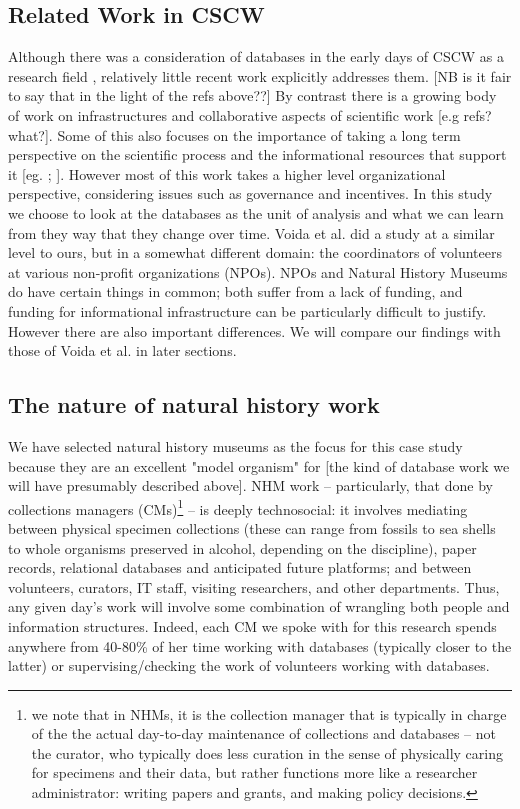 \subsection{Related Work in CSCW}
Although there was a consideration of databases in the early days of CSCW as a research field \cite{mariani1991impact}, relatively little recent work explicitly addresses them. [NB is it fair to say that in the light of the refs above??] By contrast there is a growing body of work on infrastructures and collaborative aspects of scientific work [e.g refs? what?]. Some of this also focuses  on the importance of taking a long term perspective on the scientific process and the informational resources that support it [eg. \cite{karasti2010infrastructure}; \cite{ribes2009long}]. However most of this work takes a higher level organizational perspective, considering issues such as governance and incentives. In this study we choose to look at the databases as the unit of analysis and what we can learn from they way that they change over time.  Voida et al. \cite{voida2011homebrew} did a study at a similar level to ours, but in a somewhat different domain:  the coordinators of volunteers at various non-profit organizations (NPOs). NPOs and Natural History Museums do have certain things in common; both suffer from a lack of funding, and  funding for informational infrastructure can be particularly difficult to justify. However there are also important differences. We will compare our findings with those of Voida et al. in later sections. 

\subsection{The nature of natural history work}

We have selected natural history museums as the focus for this case study because they are an excellent "model organism" for [the kind of database work we will have presumably described above]. NHM work -- particularly, that done by collections managers (CMs)\footnote{we note that in NHMs, it is the collection manager that is typically in charge of the the actual day-to-day maintenance of collections and databases -- not the curator, who typically does less curation in the sense of physically caring for specimens and their data, but rather functions more like a researcher administrator: writing papers and grants, and making policy decisions.} -- is deeply technosocial: it involves mediating between physical specimen collections (these can range from fossils to sea shells to whole organisms preserved in alcohol, depending on the discipline), paper records, relational databases and anticipated future platforms; and between volunteers, curators, IT staff, visiting researchers, and other departments. Thus, any given day’s work will involve some combination of wrangling both people and information structures. Indeed, each CM we spoke with for this research spends anywhere from 40-80\% of her time working with databases (typically closer to the latter) or supervising/checking the work of volunteers working with databases.

